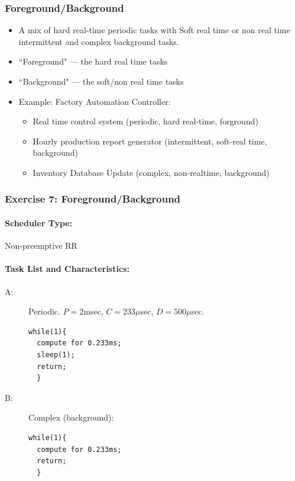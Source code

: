\subsubsection*{Foreground/Background}
\begin{itemize}
        \item A mix of hard real-time periodic tasks with
        Soft real time or non real time intermittent and complex background tasks.
        \item ``Foreground" --- the hard real time tasks
        \item ``Background" --- the soft/non real time tasks
        \item Example: Factory Automation Controller:
        \begin{itemize}
                \item  Real time control system (periodic, hard
real-time, forground)
                \item  Hourly production report generator (intermittent, soft-real time, background)
                \item  Inventory Database Update (complex, non-realtime, background)
        \end{itemize}
\end{itemize}



\subsubsection{Exercise 7: Foreground/Background}
\paragraph{Scheduler Type:} Non-preemptive RR
\paragraph{Task List and Characteristics:}
\begin{description} 
                \item[A:] Periodic.  $P = 2$msec, $C = 233\mu$sec,
                           $D =500\mu$sec.
\begin{verbatim}
while(1){
  compute for 0.233ms;
  sleep(1);
  return;
  }
\end{verbatim}
                \item[B:] Complex (background): 
\begin{verbatim}
while(1){
  compute for 0.233ms;
  return;
  }
\end{verbatim}

\end{description} 



